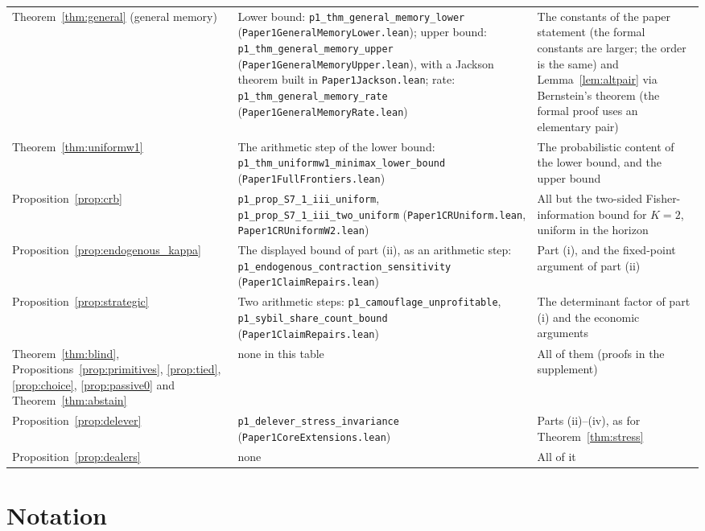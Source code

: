 \documentclass[12pt]{article}
\theoremstyle{definition}
\theoremstyle{remark}
\begin{document}
\begin{longtable}{>{\raggedright\arraybackslash}p{}>{\raggedright\arraybackslash}p{}>{\raggedright\arraybackslash}p{}}
Theorem~\ref{thm:general} (general memory) & Lower bound: \texttt{p1\_thm\_general\_memory\_lower} (\nolinkurl{Paper1GeneralMemoryLower.lean}); upper bound: \texttt{p1\_thm\_general\_memory\_upper} (\nolinkurl{Paper1GeneralMemoryUpper.lean}), with a Jackson theorem built in \nolinkurl{Paper1Jackson.lean}; rate: \texttt{p1\_thm\_general\_memory\_rate} (\nolinkurl{Paper1GeneralMemoryRate.lean}) & The constants of the paper statement (the formal constants are larger; the order is the same) and Lemma~\ref{lem:altpair} via Bernstein's theorem (the formal proof uses an elementary pair)\\
Theorem~\ref{thm:uniformw1} & The arithmetic step of the lower bound: \texttt{p1\_thm\_uniformw1\_minimax\_lower\_bound} (\nolinkurl{Paper1FullFrontiers.lean}) & The probabilistic content of the lower bound, and the upper bound\\
Proposition~\ref{prop:crb} & \nolinkurl{p1_prop_S7_1_iii_uniform}, \nolinkurl{p1_prop_S7_1_iii_two_uniform} (\nolinkurl{Paper1CRUniform.lean}, \nolinkurl{Paper1CRUniformW2.lean}) & All but the two-sided Fisher-information bound for $K=2$, uniform in the horizon\\
Proposition~\ref{prop:endogenous_kappa} & The displayed bound of part (ii), as an arithmetic step: \nolinkurl{p1_endogenous_contraction_sensitivity} (\nolinkurl{Paper1ClaimRepairs.lean}) & Part (i), and the fixed-point argument of part (ii)\\
Proposition~\ref{prop:strategic} & Two arithmetic steps: \nolinkurl{p1_camouflage_unprofitable}, \nolinkurl{p1_sybil_share_count_bound} (\nolinkurl{Paper1ClaimRepairs.lean}) & The determinant factor of part (i) and the economic arguments\\
Theorem~\ref{thm:blind}, Propositions~\ref{prop:primitives}, \ref{prop:tied}, \ref{prop:choice}, \ref{prop:passive0} and Theorem~\ref{thm:abstain} & none in this table & All of them (proofs in the supplement)\\
Proposition~\ref{prop:delever} & \texttt{p1\_delever\_stress\_invariance} (\nolinkurl{Paper1CoreExtensions.lean}) & Parts (ii)--(iv), as for Theorem~\ref{thm:stress}\\
Proposition~\ref{prop:dealers} & none & All of it\\
\bottomrule
\end{longtable}

\section{Notation}\label{app:notation}
\end{document}
